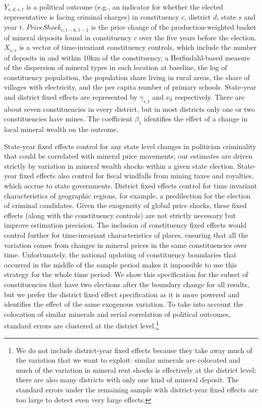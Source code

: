 \documentclass[12pt,letterpaper]{article}
\begin{document}
\noindent $Y_{c,d,s,t}$ is a political outcome (e.g., an indicator for
whether the elected representative is facing criminal charges) in
constituency $c$, district $d$, state $s$ and year
$t$. $PriceShock_{c,t-6,t-1}$ is the price change of the
production-weighted basket of mineral deposits found in constituency
$c$ over the five years before the election. $X_{c,s}$ is a vector of
time-invariant constituency controls, which include the number of
deposits in and within 10km of the constituency, a Herfindahl-based
measure of the dispersion of mineral types in each location at
baseline, the log of constituency population, the population share
living in rural areas, the share of villages with electricity, and the
per capita number of primary schools.  State-year and district fixed
effects are represented by $\gamma_{s,t}$ and $\nu_d$
respectively. There are about seven constituencies in every district,
but in most districts only one or two constituencies have mines. The
coefficient $\beta_1$ identifies the effect of a change in local
mineral wealth on the outcome.

State-year fixed effects control for any state level changes in
politician criminality that could be correlated with mineral price
movements; our estimates are driven strictly by variation in mineral
wealth shocks within a given state election.  State-year fixed effects
also control for fiscal windfalls from mining taxes and royalties,
which accrue to state governments.  District fixed effects control for
time invariant characteristics of geographic regions, for example, a
predilection for the election of criminal candidates. Given the
exogeneity of global price shocks, these fixed effects (along with the
constituency controls) are not strictly necessary but improve
estimation precision. The inclusion of constituency fixed effects
would control further for time-invariant characteristics of places,
ensuring that all the variation comes from changes in mineral prices
in the same constituencies over time. Unfortunately, the national
updating of constituency boundaries that occurred in the middle of the
sample period makes it impossible to use this strategy for the whole
time period. We show this specification for the subset of
constituencies that have two elections after the boundary change for
all results, but we prefer the district fixed effect specification as
it is more powered and identifies the effect of the same exogenous
variation.  To take into account the colocation of similar minerals
and serial correlation of political outcomes, standard errors are
clustered at the district level.\footnote{We do not include
  district-year fixed effects because they take away much of the
  variation that we want to exploit: similar minerals are colocated
  and much of the variation in mineral rent shocks is effectively at
  the district level; there are also many districts with only one kind
  of mineral deposit. The standard errors under the remaining sample
  with district-year fixed effects are too large to detect even very
  large effects.}
\end{document}
